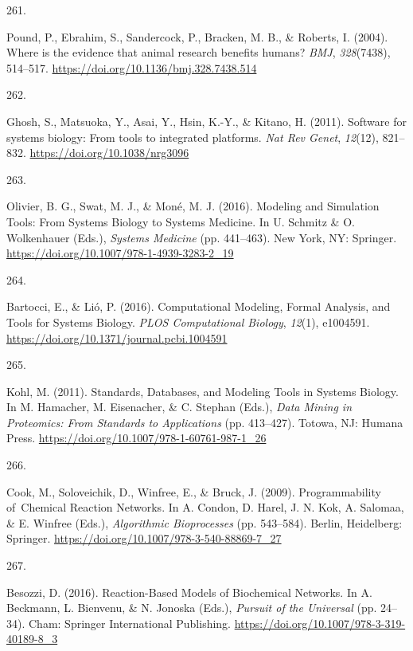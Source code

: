 \documentclass[
  11pt,
  letterpaper,
]{scrreprt}
\newlength{\cslhangindent}
\newlength{\csllabelwidth}
\newenvironment{CSLReferences}[2] %
 {\begin{list}{}{%
  \setlength{\itemindent}{0pt}
  \setlength{\leftmargin}{0pt}
  \setlength{\parsep}{0pt}
  \ifodd #1
   \setlength{\leftmargin}{\cslhangindent}
   \setlength{\itemindent}{-1\cslhangindent}
  \fi
  \setlength{\itemsep}{#2\baselineskip}}}
 {\end{list}}
\newcommand{\CSLLeftMargin}[1]{\parbox[t]{\csllabelwidth}{\strut#1\strut}}
\newcommand{\CSLRightInline}[1]{\parbox[t]{\linewidth - \csllabelwidth}{\strut#1\strut}}
\begin{document}
\begin{CSLReferences}{0}{0}
\CSLLeftMargin{261. }%
\CSLRightInline{Pound, P., Ebrahim, S., Sandercock, P., Bracken, M. B.,
\& Roberts, I. (2004). Where is the evidence that animal research
benefits humans? \emph{BMJ}, \emph{328}(7438), 514--517.
\url{https://doi.org/10.1136/bmj.328.7438.514}}

\CSLLeftMargin{262. }%
\CSLRightInline{Ghosh, S., Matsuoka, Y., Asai, Y., Hsin, K.-Y., \&
Kitano, H. (2011). Software for systems biology: From tools to
integrated platforms. \emph{Nat Rev Genet}, \emph{12}(12), 821--832.
\url{https://doi.org/10.1038/nrg3096}}

\CSLLeftMargin{263. }%
\CSLRightInline{Olivier, B. G., Swat, M. J., \& Moné, M. J. (2016).
Modeling and {Simulation Tools}: {From Systems Biology} to {Systems
Medicine}. In U. Schmitz \& O. Wolkenhauer (Eds.), \emph{Systems
{Medicine}} (pp. 441--463). New York, NY: Springer.
\url{https://doi.org/10.1007/978-1-4939-3283-2_19}}

\CSLLeftMargin{264. }%
\CSLRightInline{Bartocci, E., \& Lió, P. (2016). Computational
{Modeling}, {Formal Analysis}, and {Tools} for {Systems Biology}.
\emph{PLOS Computational Biology}, \emph{12}(1), e1004591.
\url{https://doi.org/10.1371/journal.pcbi.1004591}}

\CSLLeftMargin{265. }%
\CSLRightInline{Kohl, M. (2011). Standards, {Databases}, and {Modeling
Tools} in {Systems Biology}. In M. Hamacher, M. Eisenacher, \& C.
Stephan (Eds.), \emph{Data {Mining} in {Proteomics}: {From Standards} to
{Applications}} (pp. 413--427). Totowa, NJ: Humana Press.
\url{https://doi.org/10.1007/978-1-60761-987-1_26}}

\CSLLeftMargin{266. }%
\CSLRightInline{Cook, M., Soloveichik, D., Winfree, E., \& Bruck, J.
(2009). Programmability of~{Chemical Reaction Networks}. In A. Condon,
D. Harel, J. N. Kok, A. Salomaa, \& E. Winfree (Eds.), \emph{Algorithmic
{Bioprocesses}} (pp. 543--584). Berlin, Heidelberg: Springer.
\url{https://doi.org/10.1007/978-3-540-88869-7_27}}

\CSLLeftMargin{267. }%
\CSLRightInline{Besozzi, D. (2016). Reaction-{Based Models} of
{Biochemical Networks}. In A. Beckmann, L. Bienvenu, \& N. Jonoska
(Eds.), \emph{Pursuit of the {Universal}} (pp. 24--34). Cham: Springer
International Publishing.
\url{https://doi.org/10.1007/978-3-319-40189-8_3}}


\end{CSLReferences}
\end{document}
